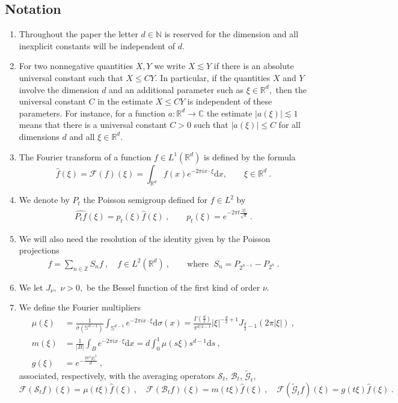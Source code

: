 \documentclass[a4paper, reqno]{amsart}
\theoremstyle{definition}
\newcommand{\R}{{\mathbb R}}
\newcommand{\N}{{\mathbb N}}
\newcommand{\C}{{\mathbb C}}
\newcommand{\dd}{{\mathrm d}}
\newcommand{\tmG}{\tilde{\mathcal{G}}}
\newcommand{\mB}{\mathcal{B}}
\newcommand{\mS}{\mathcal{S}}
\newcommand{\mF}{\mathcal{F}}
\begin{document}
\subsection{Notation}
\begin{enumerate}
\item Throughout the paper the letter $d\in \N$ is reserved for the dimension and all inexplicit constants will be
independent of $d$.  
\item For two nonnegative quantities $X, Y$
we write $X \lesssim Y$ if there is an absolute universal constant
such that $X\le CY$. In particular, if the quantities $X$ and $Y$ involve the dimension $d$ and an additional parameter such as $\xi\in \R^d,$ then the universal constant $C$ in the estimate  $X\le CY$ is independent of these parameters. For instance, for a function $a\colon\R^d\to \C$
the estimate $|a(\xi)|\lesssim 1$ means that there is a universal constant $C>0$ such that $|a(\xi)|\le C$ for all dimensions $d$ and all $\xi \in \R^d.$

\item The Fourier transform of a function $f\in L^1(\mathbb{R}^d)$ is defined by the formula
$$\widehat{f}(\xi)=\mF(f)(\xi)=\int_{\mathbb{R}^d} f(x)e^{-2\pi i x\cdot\xi} \dd x,\qquad \xi\in\R^d~.$$
\item We denote by $P_t$ the Poisson semigroup defined for $f\in L^2$ by
\begin{align}\label{defi_Poisson_semigr}
\widehat{P_tf}(\xi)=p_t(\xi)\widehat{f}(\xi)~, \qquad  p_t(\xi)=e^{-2\pi t \tfrac{|\xi|}{\sqrt{d}}}~.
\end{align}
\item 
We will also need the resolution of the identity given by the Poisson projections
\begin{align}\label{defi_Poisson_projection}
f=\sum_{n\in\mathbb{Z}}S_nf~, \quad f\in L^2(\mathbb{R}^d)~, \qquad \text{where } \; S_n=P_{2^{n-1}}-P_{2^n}~.
\end{align}
\item 
We let $J_\nu,$ $\nu>0,$ be the Bessel function of the first kind of order $\nu.$

\item 
 We define the Fourier multipliers
 \begin{align*}
  \mu(\xi)  &=\frac{1}{\sigma(\mathbb{S}^{d-1})} \int_{\mathbb{S}^{d-1}} e^{- 2\pi i x\cdot \xi} \dd\sigma(x)= \frac{\Gamma(\tfrac{d}{2})}{\pi^{d/2-1}} |\xi|^{-\tfrac{d}{2}+1} J_{\tfrac{d}{2}-1}(2\pi |\xi|)~, \\
  m(\xi)  &=  \frac{1}{|B|}  \int_{B} e^{-2\pi i x\cdot \xi} \dd x = d \int_0^1 \mu(s \xi) s^{d-1} \dd s ~, \\
g(\xi)  &=e^{-\tfrac{2\pi^2|\xi|^2}{d}}~,
\end{align*}
associated, respectively, with the averaging operators $\mS_t$, $\mB_t$, $\tmG_t$, 
$$\mF(\mS_tf)(\xi)=\mu(t\xi)\widehat{f}(\xi)~, \quad \mF(\mB_tf)(\xi)=m(t\xi)\widehat{f}(\xi)~, \quad \mF(\tmG_t f)(\xi)=g(t\xi)\widehat{f}(\xi)~.$$




\end{enumerate}
\end{document}
